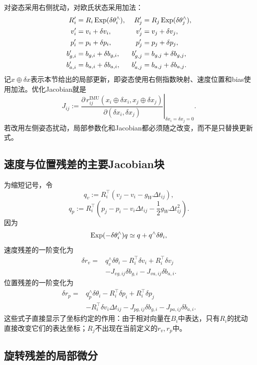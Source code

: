 对姿态采用右侧扰动，对欧氏状态采用加法：
\[
\begin{aligned}
    R_i'&=R_i\operatorname{Exp}(\delta\theta_i^\wedge),
    &R_j'&=R_j\operatorname{Exp}(\delta\theta_j^\wedge),\\
    v_i'&=v_i+\delta v_i,
    &v_j'&=v_j+\delta v_j,\\
    p_i'&=p_i+\delta p_i,
    &p_j'&=p_j+\delta p_j,\\
    b_{g,i}'&=b_{g,i}+\delta b_{g,i},
    &b_{g,j}'&=b_{g,j}+\delta b_{g,j},\\
    b_{a,i}'&=b_{a,i}+\delta b_{a,i},
    &b_{a,j}'&=b_{a,j}+\delta b_{a,j}.
\end{aligned}
\]
记$x\oplus\delta x$表示本节给出的局部更新，即姿态使用右侧指数映射、速度位置和bias使用加法。优化Jacobian就是
\[
    J_{ij}
    :=\left.
    \frac{\partial\,r_{ij}^{\mathrm{IMU}}(x_i\oplus\delta x_i,
                                           x_j\oplus\delta x_j)}
         {\partial(\delta x_i,\delta x_j)}
    \right|_{\delta x_i=\delta x_j=0}.
\]
若改用左侧姿态扰动，局部参数化和Jacobian都必须随之改变，而不是只替换更新式。

\subsection{速度与位置残差的主要Jacobian块}

为缩短记号，令
\[
    q_v:=R_i^\top(v_j-v_i-g_W\Delta t_{ij}),
\]
\[
    q_p:=R_i^\top
      \left(
        p_j-p_i-v_i\Delta t_{ij}
        -\frac12g_W\Delta t_{ij}^2
      \right).
\]
因为
\[
    \operatorname{Exp}(-\delta\theta_i^\wedge)q
    \simeq q+q^\wedge\delta\theta_i,
\]
速度残差的一阶变化为
\[
\begin{aligned}
    \delta r_v
    ={}&q_v^\wedge\delta\theta_i
      -R_i^\top\delta v_i
      +R_i^\top\delta v_j\\
      &-J_{v g,ij}\delta b_{g,i}
      -J_{v a,ij}\delta b_{a,i}.
\end{aligned}
\]
位置残差的一阶变化为
\[
\begin{aligned}
    \delta r_p
    ={}&q_p^\wedge\delta\theta_i
      -R_i^\top\delta p_i
      +R_i^\top\delta p_j\\
      &-R_i^\top\delta v_i\Delta t_{ij}
      -J_{p g,ij}\delta b_{g,i}
      -J_{p a,ij}\delta b_{a,i}.
\end{aligned}
\]
这些式子直接显示了坐标约定的作用：由于相对向量在$B_i$中表达，只有$R_i$的扰动直接改变它们的表达坐标；$R_j$不出现在当前定义的$r_v,r_p$中。

\subsection{旋转残差的局部微分}

